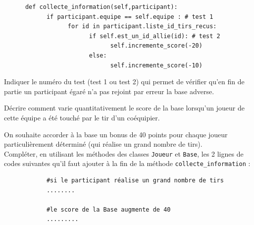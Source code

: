 \documentclass[a4paper,12pt,eval,firamath]{nsi}
\begin{document}
\begin{pyc}
\begin{verbatim}
      def collecte_information(self,participant):
            if participant.equipe == self.equipe : # test 1
                  for id in participant.liste_id_tirs_recus:
                        if self.est_un_id_allie(id): # test 2
                              self.incremente_score(-20)
                        else:
                              self.incremente_score(-10)
\end{verbatim}
\end{pyc}
\begin{enumalph}
      \item Indiquer le numéro du test (test 1 ou test 2) qui permet de vérifier qu'en fin de
      partie un participant égaré n'a pas rejoint par erreur la base adverse.\\


      \item Décrire comment varie quantitativement le score de la base lorsqu'un joueur
      de cette équipe a été touché par le tir d'un coéquipier.

\end{enumalph}

On souhaite accorder à la base un bonus de 40 points pour chaque joueur particulièrement déterminé (qui réalise un grand nombre de tirs).\\

\question Compléter, en utilisant les méthodes des classes \texttt{Joueur} et \texttt{Base}, les 2 lignes de codes suivantes qu'il faut ajouter à la fin de la méthode \texttt{collecte_information} :
\begin{pyc}
      \begin{verbatim}
            #si le participant réalise un grand nombre de tirs
            ........ 

            #le score de la Base augmente de 40
            .........             
      \end{verbatim}
\end{pyc}
\end{document}
